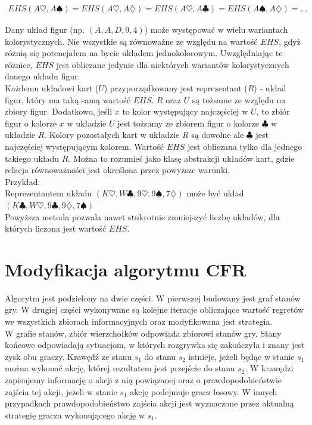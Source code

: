 \documentclass[licencjacka]{pracamgr}
\begin{document}
\begin{align*}
EHS(A\heartsuit, A\spadesuit) = EHS(A\heartsuit, A\diamondsuit) = EHS(A\heartsuit, A\clubsuit) = EHS(A\spadesuit, A\diamondsuit) = ...
\end{align*}

\noindent
Dany układ figur (np. $(A,A,D,9,4)$) może występować w wielu wariantach kolorystycznych. Nie wszystkie są równoważne ze względu
na wartość $EHS$, gdyż różnią się potencjałem na bycie układem jednokolorowym. Uwzględniając te różnice, $EHS$ jest obliczane jedynie
dla niektórych wariantów kolorystycznych danego układu figur. \\

\noindent
Każdemu układowi kart ($U$) przyporządkowany jest reprezentant ($R$) - układ figur, który ma taką samą wartość $EHS$.
$R$ oraz $U$ są tożsame ze względu na zbiory figur. Dodatkowo, jeśli $x$ to kolor występujący najczęściej w $U$,
to zbiór figur o kolorze $x$ w układzie $U$ jest tożsamy ze zbiorem figur o kolorze $\clubsuit$ w układzie $R$.
Kolory pozostałych kart w układzie $R$ są dowolne ale $\clubsuit$ jest najczęściej występującym kolorem. Wartość
$EHS$ jest obliczana tylko dla jednego takiego układu $R$. Można to rozumieć jako klasę abstrakcji układów kart, gdzie
relacja równoważności jest określona przez powyższe warunki. \\

\noindent
Przykład: \\

\noindent
Reprezentantem układu $(K\heartsuit, W\clubsuit, 9\heartsuit, 9\spadesuit, 7\diamondsuit)$ może być układ
$(K\clubsuit, W\heartsuit, 9\clubsuit, 9\diamondsuit, 7\spadesuit)$ \\

\noindent
Powyższa metoda pozwala nawet stukrotnie zmniejszyć liczbę układów, dla których liczona jest wartość $EHS$.

\section{Modyfikacja algorytmu CFR}

\noindent
Algorytm jest podzielony na dwie części. W pierwszej budowany jest graf stanów gry. W drugiej części
wykonywane są kolejne iteracje obliczające wartość regretów we wszystkich zbiorach informacyjnych oraz
modyfikowana jest strategia. \\

\noindent
W grafie stanów, zbiór wierzchołków odpowiada zbiorowi stanów gry. Stany końcowe odpowiadają
sytuacjom, w których rozgrywka się zakończyła i znany jest zysk obu graczy. Krawędź ze stanu $s_1$ do stanu $s_2$
istnieje, jeżeli będąc w stanie $s_1$ można wykonać akcję, której rezultatem jest przejście do stanu
$s_2$. W krawędzi zapisujemy informację o akcji z nią powiązanej oraz o prawdopodobieństwie zajścia
tej akcji, jeżeli w stanie $s_1$ akcję podejmuje gracz losowy. W innych przypadkach prawdopodobieństwo
zajścia akcji jest wyznaczone przez aktualną strategię gracza wykonującego akcję w $s_1$. \\
\end{document}
